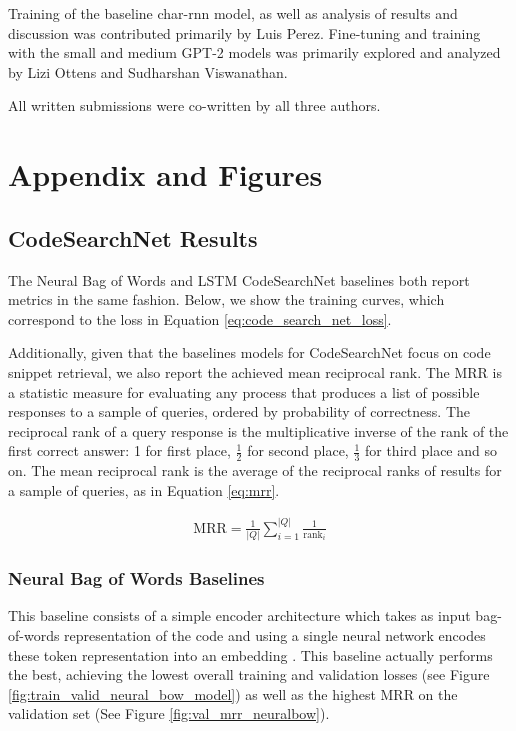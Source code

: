 \documentclass[10pt,twocolumn]{article}
\begin{document}
Training of the baseline char-rnn model, as well as analysis of results and discussion was contributed primarily by Luis Perez. Fine-tuning and training with the small and medium GPT-2 models was primarily explored and analyzed by Lizi Ottens and Sudharshan Viswanathan.

All written submissions were co-written by all three authors. 




\newpage
\onecolumn
\section*{Appendix and Figures}
\subsection{CodeSearchNet Results}
\label{sec:codesearchnet_results}

The Neural Bag of Words and LSTM CodeSearchNet baselines both report metrics in the same fashion. Below, we show the training curves, which correspond to the loss in Equation \eqref{eq:code_search_net_loss}.

Additionally, given that the baselines models for CodeSearchNet focus on code snippet retrieval, we also report the achieved mean reciprocal rank. The MRR is a statistic measure for evaluating any process that produces a list of possible responses to a sample of queries, ordered by probability of correctness. The reciprocal rank of a query response is the multiplicative inverse of the rank of the first correct answer: 1 for first place, $\frac{1}{2}$ for second place, $\frac{1}{3}$ for third place and so on. The mean reciprocal rank is the average of the reciprocal ranks of results for a sample of queries, as in Equation \eqref{eq:mrr}.

\begin{align}
    \text{MRR} = \frac{1}{|Q|}\sum_{i=1}^{|Q|} \frac{1}{\text{rank}_i}
    \label{eq:mrr}
\end{align}

\subsubsection{Neural Bag of Words Baselines}
This baseline consists of a simple encoder architecture which takes as input bag-of-words representation of the code and using a single neural network encodes these token representation into an embedding \cite{codesearchnet}. This baseline actually performs the best, achieving the lowest overall training and validation losses (see Figure \ref{fig:train_valid_neural_bow_model}) as well as the highest MRR on the validation set (See Figure \ref{fig:val_mrr_neuralbow}).
\end{document}
